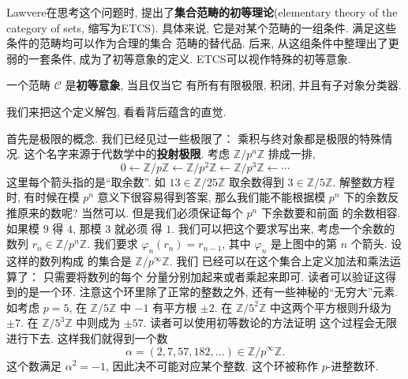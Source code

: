 Lawvere在思考这个问题时, 提出了\textbf{集合范畴的初等理论}(elementary
theory of the category of sets, 缩写为ETCS). 具体来说,
它是对某个范畴的一组条件. 满足这些条件的范畴均可以作为合理的集合
范畴的替代品. 后来, 从这组条件中整理出了更弱的一套条件,
成为了初等意象的定义. ETCS可以视作特殊的初等意象.
\begin{definition}
一个范畴 \(\mathcal C\) 是\textbf{初等意象}, 当且仅当它
有所有有限极限, 积闭, 并且有子对象分类器.
\end{definition}
我们来把这个定义解包, 看看背后蕴含的直觉.

首先是极限的概念.
我们已经见过一些极限了： 乘积与终对象都是极限的特殊情况.
这个名字来源于代数学中的\textbf{投射极限}. 考虑
\(\mathbb Z/p^n\mathbb Z\) 排成一排,
\[0 \longleftarrow \mathbb Z/p\mathbb Z
\longleftarrow \mathbb Z/p^2\mathbb Z
\longleftarrow \mathbb Z/p^3\mathbb Z
\longleftarrow \cdots\]
这里每个箭头指的是“取余数”. 如
\(13 \in \mathbb Z/25\mathbb Z\)
取余数得到 \(3 \in \mathbb Z/5 \mathbb Z\).
解整数方程时, 有时候在模 \(p^n\) 意义下很容易得到答案,
那么我们能不能根据模 \(p^n\) 下的余数反推原来的数呢?
当然可以. 但是我们必须保证每个 \(p^n\) 下余数要和前面
的余数相容. 如果模 \(9\) 得 \(4\), 那模 \(3\) 就必须
得 \(1\). 我们可以把这个要求写出来, 考虑一个余数的数列
\(r_n \in \mathbb Z/p^n\mathbb Z\).
我们要求 \(\varphi_n(r_n) = r_{n-1}\), 其中
\(\varphi_n\) 是上图中的第 \(n\) 个箭头. 设这样的数列构成
的集合是 \(\mathbb Z/p^{\infty}\mathbb Z\). 我们
已经可以在这个集合上定义加法和乘法运算了： 只需要将数列的每个
分量分别加起来或者乘起来即可. 读者可以验证这得到的是一个环.
注意这个环里除了正常的整数之外, 还有一些神秘的“无穷大”元素.
如考虑 \(p = 5\), 在 \(\mathbb Z/5\mathbb Z\) 中
\(-1\) 有平方根 \(\pm2\). 在 \(\mathbb Z/5^2\mathbb Z\)
中这两个平方根则升级为 \(\pm7\). 在 \(\mathbb Z/5^3\mathbb Z\)
中则成为 \(\pm57\). 读者可以使用初等数论的方法证明
这个过程会无限进行下去. 这样我们就得到一个数
\[\alpha = (2,7,57,182,\dots) \in \mathbb Z/p^{\infty}\mathbb Z.\]
这个数满足 \(\alpha^2 = -1\), 因此决不可能对应某个整数.
这个环被称作 \(p\)-进整数环.

